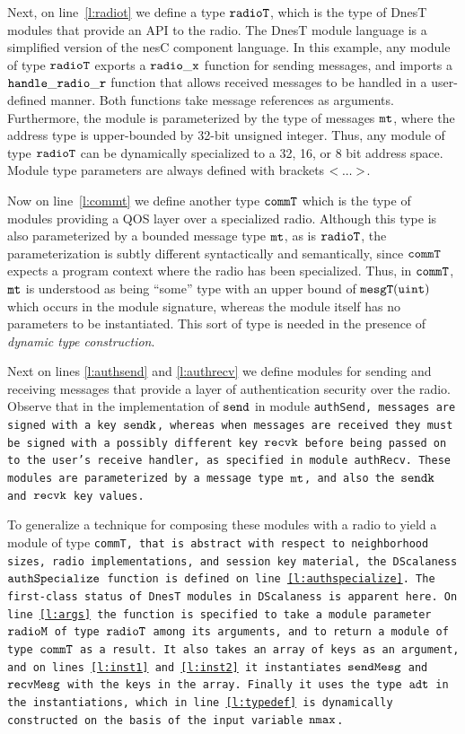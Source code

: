 Next, on line~\ref{l:radiot} we define a type $\tt{radioT}$, which is the type of DnesT modules
that provide an API to the radio. The DnesT module language is a simplified version of the nesC
component language. In this example, any module of type $\tt{radioT}$ exports a $\tt{radio\_x}$
function for sending messages, and imports a $\tt{handle\_radio\_r}$ function that allows
received messages to be handled in a user-defined manner. Both functions take message references
as arguments. Furthermore, the module is parameterized by the type of messages $\tt{mt}$, where
the address type is upper-bounded by 32-bit unsigned integer. Thus, any module of type
$\tt{radioT}$ can be dynamically specialized to a 32, 16, or 8 bit address space. Module type
parameters are always defined with brackets $\tt{<...>}$.
 
Now on line~\ref{l:commt} we define another type $\tt{commT}$ which is the type of modules
providing a QOS layer over a specialized radio. Although this type is also parameterized by a
bounded message type $\tt{mt}$, as is $\tt{radioT}$, the parameterization is subtly different
syntactically and semantically, since $\tt{commT}$ expects a program context where the radio has
been specialized. Thus, in $\tt{commT}$, $\tt{mt}$ is understood as being ``some'' type with an
upper bound of $\tt{mesgT(uint)}$ which occurs in the module signature, whereas the module
itself has no parameters to be instantiated. This sort of type is needed in the presence of
\emph{dynamic type construction}.

Next on lines \ref{l:authsend} and \ref{l:authrecv} we define modules for sending and receiving
messages that provide a layer of authentication security over the radio. Observe that in the
implementation of $\tt{send}$ in module \tt{authSend}, messages are signed with a key
$\tt{sendk}$, whereas when messages are received they must be signed with a possibly different
key $\tt{recvk}$ before being passed on to the user's receive handler, as specified in module
\tt{authRecv}. These modules are parameterized by a message type $\tt{mt}$, and also the
$\tt{sendk}$ and $\tt{recvk}$ key values.

To generalize a technique for composing these modules with a radio to yield a module of type
\tt{commT}, that is abstract with respect to neighborhood sizes, radio implementations, and
session key material, the DScalaness $\tt{authSpecialize}$ function is defined on
line~\ref{l:authspecialize}. The first-class status of DnesT modules in DScalaness is apparent
here. On line~\ref{l:args} the function is specified to take a module parameter $\tt{radioM}$ of
type $\tt{radioT}$ among its arguments, and to return a module of type $\tt{commT}$ as a result.
It also takes an array of keys as an argument, and on lines~\ref{l:inst1} and~\ref{l:inst2} it
instantiates $\tt{sendMesg}$ and $\tt{recvMesg}$ with the keys in the array. Finally it uses the
type $\tt{adt}$ in the instantiations, which in line~\ref{l:typedef} is dynamically constructed
on the basis of the input variable $\tt{nmax}$.

